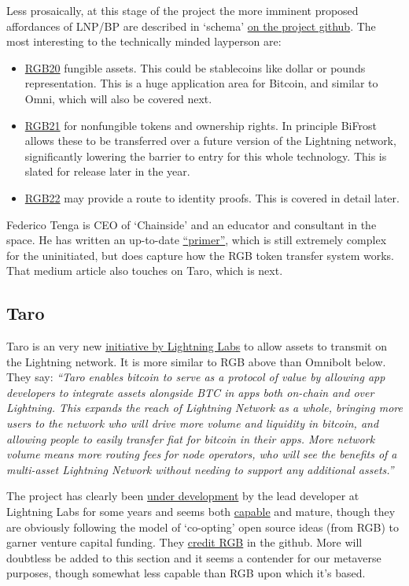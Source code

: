 Less prosaically, at this stage of the project the more imminent proposed affordances of LNP/BP are described in `schema' \href{https://github.com/LNP-BP/LNPBPs}{on the project github}. The most interesting to the technically minded layperson are:
\begin{itemize}
\item \href{https://github.com/LNP-BP/LNPBPs/blob/master/lnpbp-0020.md}{RGB20} fungible assets. This could be stablecoins like dollar or pounds representation. This is a huge application area for Bitcoin, and similar to Omni, which will also be covered next.
\item \href{https://github.com/LNP-BP/LNPBPs/blob/master/lnpbp-0021.md}{RGB21} for nonfungible tokens and ownership rights. In principle BiFrost allows these to be transferred over a future version of the Lightning network, significantly lowering the barrier to entry for this whole technology. This is slated for release later in the year.
\item \href{https://github.com/LNP-BP/LNPBPs/issues/29}{RGB22} may provide a route to identity proofs. This is covered in detail later.
\end{itemize}
Federico Tenga is CEO of `Chainside' and an educator and consultant in the space. He has written an up-to-date \href{https://medium.com/@FedericoTenga/understanding-rgb-protocol-7dc7819d3059}{``primer''}, which is still extremely complex for the uninitiated, but does capture how the RGB token transfer system works. That medium article also touches on Taro, which is next.
\subsection{Taro}
Taro is an very new \href{https://lightning.engineering/posts/2022-4-5-taro-launch/}{initiative by Lightning Labs} to allow assets to transmit on the Lightning network. It is more similar to RGB above than Omnibolt below. They say: \textit{``Taro enables bitcoin to serve as a protocol of value by allowing app developers to integrate assets alongside BTC in apps both on-chain and over Lightning. This expands the reach of Lightning Network as a whole, bringing more users to the network who will drive more volume and liquidity in bitcoin, and allowing people to easily transfer fiat for bitcoin in their apps. More network volume means more routing fees for node operators, who will see the benefits of a multi-asset Lightning Network without needing to support any additional assets.''}\par
The project has clearly been \href{https://github.com/roasbeef/bips/tree/bip-taro}{under development} by the lead developer at Lightning Labs for some years and seems both \href{https://lightninglabs.substack.com/p/bitcoinizing-the-dollar-and-the-world?s=r}{capable} and mature, though they are obviously following the model of `co-opting' open source ideas (from RGB) to garner venture capital funding. They \href{https://github.com/bitcoin/bips/pull/1298/commits/4daba8c373c777defb48136795382803c137502c}{credit RGB} in the github. More will doubtless be added to this section and it seems a contender for our metaverse purposes, though somewhat less capable than RGB upon which it's based.
